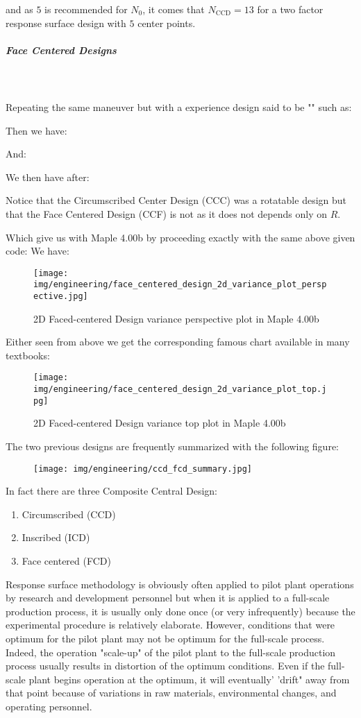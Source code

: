 	and as $5$ is recommended for $N_0$, it comes that $N_{\text{CCD}}=13$ for a two factor response surface design with $5$ center points.
	
	\pagebreak
	\subparagraph{Face Centered Designs}\mbox{}\\\\
	Repeating the same maneuver but with a experience design said to be "" such as:
	
	Then we have:
	
	And:
	
	We then have after:
	
	Notice that the Circumscribed Center Design (CCC) was a rotatable design but that the Face Centered Design (CCF) is not as it does not depends only on $R$.
	
	Which give us with Maple 4.00b by proceeding exactly with the same above given code:
	We have:
	\begin{figure}[H]
		\centering
		\texttt{[image: img/engineering/face\_centered\_design\_2d\_variance\_plot\_perspective.jpg]}	
		\caption{2D Faced-centered Design variance perspective plot in Maple 4.00b}
	\end{figure}
	Either seen from above we get the corresponding famous chart available in many textbooks:
	\begin{figure}[H]
		\centering
		\texttt{[image: img/engineering/face\_centered\_design\_2d\_variance\_plot\_top.jpg]}	
		\caption{2D Faced-centered Design variance top plot in Maple 4.00b}
	\end{figure}
	The two previous designs are frequently summarized with the following figure:
	\begin{figure}[H]
		\centering
		\texttt{[image: img/engineering/ccd\_fcd\_summary.jpg]}	
	\end{figure}
	In fact there are three Composite Central Design:
	\begin{enumerate}
		\item Circumscribed (CCD)
		\item Inscribed (ICD)
		\item Face centered (FCD)
	\end{enumerate}
	Response surface methodology is obviously often applied to pilot plant operations by research and development personnel but when it is applied to a full-scale production process, it is usually only done once (or very infrequently) because the experimental procedure is relatively elaborate. However, conditions that were optimum for the pilot plant may not be optimum for the full-scale process. Indeed, the operation "scale-up" of the pilot plant to the full-scale production process usually results in distortion of the optimum conditions. Even if the full-scale plant begins operation at the optimum, it will eventually' 'drift" away from that point because of variations in raw materials, environmental changes, and operating personnel.

